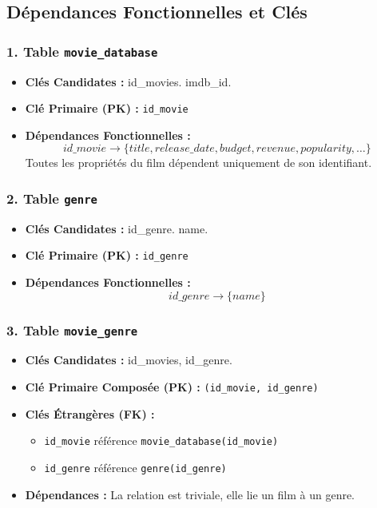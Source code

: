 \documentclass[12pt]{article}
\begin{document}
\subsection{Dépendances Fonctionnelles et Clés}

\subsubsection{1. Table \texttt{movie\_database}}
\begin{itemize}
    \item \textbf{Clés Candidates :} id\_movies. imdb\_id.
    \item \textbf{Clé Primaire (PK) :} \texttt{id\_movie}
    \item \textbf{Dépendances Fonctionnelles :}
    \[ id\_movie \rightarrow \{ title, release\_date, budget, revenue, popularity, \dots \} \]
    Toutes les propriétés du film dépendent uniquement de son identifiant.
\end{itemize}

\subsubsection{2. Table \texttt{genre}}
\begin{itemize}
     \item \textbf{Clés Candidates :} id\_genre. name.
    \item \textbf{Clé Primaire (PK) :} \texttt{id\_genre}
    \item \textbf{Dépendances Fonctionnelles :}
    \[ id\_genre \rightarrow \{ name \} \]
\end{itemize}

\subsubsection{3. Table \texttt{movie\_genre}}
\begin{itemize}
     \item \textbf{Clés Candidates :} id\_movies, id\_genre.
    \item \textbf{Clé Primaire Composée (PK) :} \texttt{(id\_movie, id\_genre)}
    \item \textbf{Clés Étrangères (FK) :}
        \begin{itemize}
            \item \texttt{id\_movie} référence \texttt{movie\_database(id\_movie)}
            \item \texttt{id\_genre} référence \texttt{genre(id\_genre)}
        \end{itemize}
    \item \textbf{Dépendances :} La relation est triviale, elle lie un film à un genre.
\end{itemize}
\end{document}
